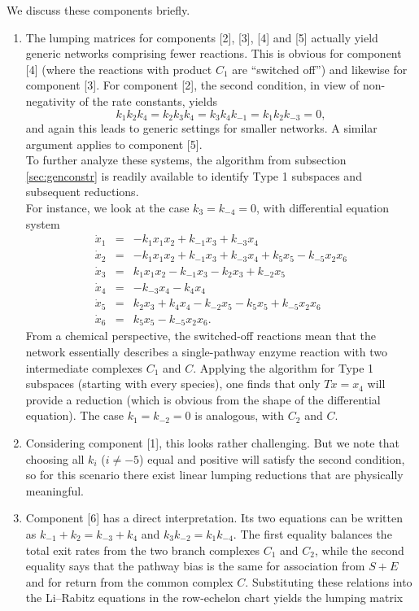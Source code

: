 \documentclass{article}
\begin{document}
We discuss these components briefly. 
\begin{enumerate}
    \item 
The lumping matrices for components [2], [3], [4] and [5] actually yield generic networks comprising fewer reactions. This is obvious for component [4] (where the reactions with product $C_1$ are ``switched off'') and likewise for component [3]. For component [2], the second condition, in view of non-negativity of the rate constants, yields 
\[
k_1k_2k_4=k_2k_3k_4=k_3k_4k_{-1}=k_1k_2k_{-3}=0,
\]
and again this leads to generic settings for smaller networks. A similar argument applies to component [5]. \\
To further analyze these systems, the algorithm from subsection \ref{sec:genconstr} is readily available to identify Type 1 subspaces and subsequent reductions.\\
For instance, we look at the case $k_3=k_{-4}=0$,
with differential equation system
\begin{equation*}
\begin{array}{rcl}
\dot x_1 &=& -k_1x_1x_2+  k_{-1} x_3 + k_{-3} x_4 \\[3pt]
\dot x_2 &=& -k_1x_1x_2+k_{-1} x_3  + k_{-3} x_4 + k_5 x_5 -k_{-5}x_2x_6\\[3pt]
\dot x_3 &=&  k_1x_1x_2- k_{-1} x_3 - k_2 x_3 + k_{-2} x_5 \\[3pt]
\dot x_4 &=&  - k_{-3} x_4 -k_4x_4 \\[3pt]
\dot x_5 &=& k_2 x_3 +k_4x_4 - k_{-2} x_5 - k_5 x_5 +k_{-5}x_2x_6\\[3pt]
\dot x_6 &=& k_5 x_5 -k_{-5}x_2x_6.
\end{array}
\end{equation*}
From a chemical perspective, the switched-off reactions mean that the network essentially describes a single-pathway enzyme reaction with two intermediate complexes $C_1$ and $C$.
Applying the algorithm for Type 1 subspaces (starting with every species), one finds that only $Tx=x_4$ will provide a reduction (which is obvious from the shape of the differential equation). The case $k_1=k_{-2}=0$ is analogous, with $C_2$ and $C$.
\item Considering component [1], this looks rather challenging. But we note that choosing all $k_i$ ($i\not=-5$) equal and positive will satisfy the second condition, so for this scenario there exist linear lumping reductions that are physically meaningful.
\item Component [6] has a direct interpretation.  Its two equations can be written as $k_{-1}+k_2=k_{-3}+k_4$ and $k_3k_{-2}=k_1k_{-4}$.  The first equality balances the total exit rates from the two branch complexes $C_1$ and $C_2$, while the second equality says that the pathway bias is the same for association from $S+E$ and for return from the common complex $C$.  Substituting these relations into the Li--Rabitz equations in the row-echelon chart yields the lumping matrix

\end{enumerate}
\end{document}
